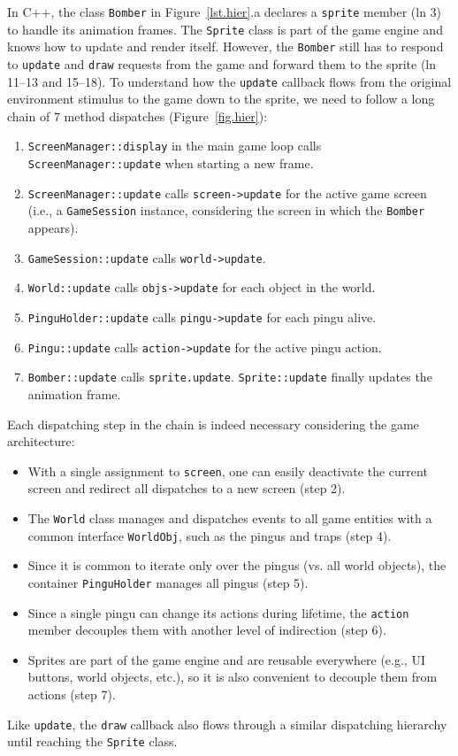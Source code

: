 \documentclass[times,twocolumn,final]{elsarticle}
\newcommand{\code}[1] {{\small{\texttt{#1}}}}
\begin{document}
In C++, the class \code{Bomber} in Figure~\ref{lst.hier}.a declares a
\code{sprite} member (ln 3) to handle its animation frames.
%
The \code{Sprite} class is part of the game engine and knows how to update and
render itself.
However, the \code{Bomber} still has to respond to \code{update} and
\code{draw} requests from the game and forward them to the sprite
(ln 11--13 and 15--18).
%
To understand how the \code{update} callback flows from the original
environment stimulus to the game down to the sprite, we need to follow a long
chain of 7 method dispatches (Figure~\ref{fig.hier}):
%
\begin{enumerate}
\item \code{ScreenManager::display} in the main game loop calls\\
      \code{ScreenManager::update} when starting a new frame.
\item \code{ScreenManager::update} calls \code{screen->update} for the active
      game screen (i.e., a \code{GameSession} instance, considering the screen
      in which the \code{Bomber} appears).
\item \code{GameSession::update} calls \code{world->update}.
\item \code{World::update} calls \code{objs->update} for each object in the
      world.
\item \code{PinguHolder::update} calls \code{pingu->update} for each pingu
      alive.
\item \code{Pingu::update} calls \code{action->update} for the active pingu
      action.
\item \code{Bomber::update} calls \code{sprite.update}.
      \code{Sprite::update} finally updates the animation frame.
\end{enumerate}
%
Each dispatching step in the chain is indeed necessary considering the game
architecture:
%
\begin{itemize}
\item With a single assignment to \code{screen}, one can easily deactivate the
current screen and redirect all dispatches to a new screen (step 2).
\item The \code{World} class manages and dispatches events to all game
      entities with a common interface \code{WorldObj}, such as the pingus and
      traps (step 4).
\item Since it is common to iterate only over the pingus (vs. all world
      objects), the container \code{PinguHolder} manages all pingus (step 5).
\item Since a single pingu can change its actions during lifetime, the
      \code{action} member decouples them with another level of indirection
      (step 6).
\item Sprites are part of the game engine and are reusable everywhere (e.g., UI
      buttons, world objects, etc.), so it is also convenient to decouple them
      from actions (step 7).
\end{itemize}
%
Like \code{update}, the \code{draw} callback also flows through a similar
dispatching hierarchy until reaching the \code{Sprite} class.
\end{document}
